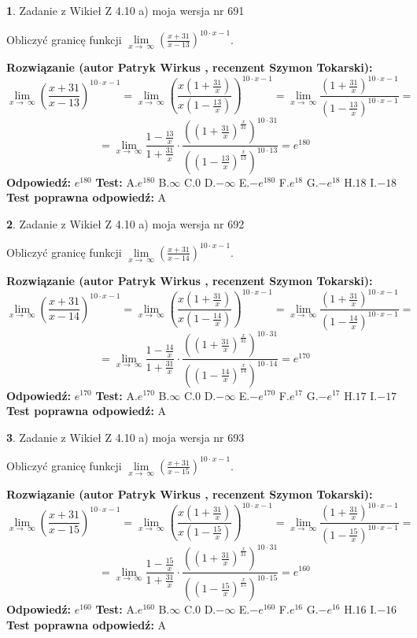 \documentclass[12pt, a4paper]{article}
\theoremstyle{definition} %
\newtheorem{zad}{}
\newcommand{\zadStart}[1]{\begin{zad}#1\newline}
\newcommand{\zadStop}{\end{zad}}
\newcommand{\rozwStart}[2]{\noindent \textbf{Rozwiązanie (autor #1 , recenzent #2): }\newline}
\newcommand{\rozwStop}{\newline}
\newcommand{\odpStart}{\noindent \textbf{Odpowiedź:}\newline}
\newcommand{\odpStop}{\newline}
\newcommand{\testStart}{\noindent \textbf{Test:}\newline}
\newcommand{\testStop}{\newline}
\newcommand{\kluczStart}{\noindent \textbf{Test poprawna odpowiedź:}\newline}
\newcommand{\kluczStop}{\newline}
\begin{document}
\zadStart{Zadanie z Wikieł Z 4.10 a) moja wersja nr 691}

Obliczyć granicę funkcji  $\lim\limits_{x\to\ \infty}(\frac{x+31}{x-13})^{10\cdot x-1}$.
\zadStop
\rozwStart{Patryk Wirkus}{Szymon Tokarski}
$$\lim\limits_{x\to\ \infty}(\frac{x+31}{x-13})^{10\cdot x-1} = \lim\limits_{x\to\ \infty}(\frac{x(1+\frac{31}{x})}{x(1-\frac{13}{x})})^{10\cdot x-1}=\lim\limits_{x\to\ \infty}\frac{(1+\frac{31}{x})^{10\cdot x-1}}{(1-\frac{13}{x})^{10\cdot x-1}}=$$
$$=\lim\limits_{x\to\ \infty}\frac{1-\frac{13}{x}}{1+\frac{31}{x}}\cdot\frac{((1+\frac{31}{x})^{\frac{x}{31}})^{10\cdot31}}{((1-\frac{13}{x})^{\frac{x}{13}})^{10\cdot13}}=e^{180}$$
\rozwStop
\odpStart
$e^{180}$
\odpStop
\testStart
A.$e^{180}$ B.$\infty$ C.$0$ D.$-\infty$ E.$-e^{180}$
F.$e^{18}$ G.$-e^{18}$
H.$18$
I.$-18$
\testStop
\kluczStart
A
\kluczStop



\zadStart{Zadanie z Wikieł Z 4.10 a) moja wersja nr 692}

Obliczyć granicę funkcji  $\lim\limits_{x\to\ \infty}(\frac{x+31}{x-14})^{10\cdot x-1}$.
\zadStop
\rozwStart{Patryk Wirkus}{Szymon Tokarski}
$$\lim\limits_{x\to\ \infty}(\frac{x+31}{x-14})^{10\cdot x-1} = \lim\limits_{x\to\ \infty}(\frac{x(1+\frac{31}{x})}{x(1-\frac{14}{x})})^{10\cdot x-1}=\lim\limits_{x\to\ \infty}\frac{(1+\frac{31}{x})^{10\cdot x-1}}{(1-\frac{14}{x})^{10\cdot x-1}}=$$
$$=\lim\limits_{x\to\ \infty}\frac{1-\frac{14}{x}}{1+\frac{31}{x}}\cdot\frac{((1+\frac{31}{x})^{\frac{x}{31}})^{10\cdot31}}{((1-\frac{14}{x})^{\frac{x}{14}})^{10\cdot14}}=e^{170}$$
\rozwStop
\odpStart
$e^{170}$
\odpStop
\testStart
A.$e^{170}$ B.$\infty$ C.$0$ D.$-\infty$ E.$-e^{170}$
F.$e^{17}$ G.$-e^{17}$
H.$17$
I.$-17$
\testStop
\kluczStart
A
\kluczStop



\zadStart{Zadanie z Wikieł Z 4.10 a) moja wersja nr 693}

Obliczyć granicę funkcji  $\lim\limits_{x\to\ \infty}(\frac{x+31}{x-15})^{10\cdot x-1}$.
\zadStop
\rozwStart{Patryk Wirkus}{Szymon Tokarski}
$$\lim\limits_{x\to\ \infty}(\frac{x+31}{x-15})^{10\cdot x-1} = \lim\limits_{x\to\ \infty}(\frac{x(1+\frac{31}{x})}{x(1-\frac{15}{x})})^{10\cdot x-1}=\lim\limits_{x\to\ \infty}\frac{(1+\frac{31}{x})^{10\cdot x-1}}{(1-\frac{15}{x})^{10\cdot x-1}}=$$
$$=\lim\limits_{x\to\ \infty}\frac{1-\frac{15}{x}}{1+\frac{31}{x}}\cdot\frac{((1+\frac{31}{x})^{\frac{x}{31}})^{10\cdot31}}{((1-\frac{15}{x})^{\frac{x}{15}})^{10\cdot15}}=e^{160}$$
\rozwStop
\odpStart
$e^{160}$
\odpStop
\testStart
A.$e^{160}$ B.$\infty$ C.$0$ D.$-\infty$ E.$-e^{160}$
F.$e^{16}$ G.$-e^{16}$
H.$16$
I.$-16$
\testStop
\kluczStart
A
\kluczStop
\end{document}
